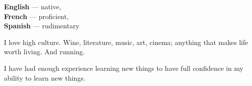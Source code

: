 \documentclass[9pt]{developercv} %
\begin{document}

\begin{minipage}[t]{0.2\textwidth}
	\vspace{-\baselineskip} %


        \textbf{English} — native,\\
        \textbf{French} — proficient,\\
        \textbf{Spanish} — rudimentary

\end{minipage}
\hfill
\begin{minipage}[t]{0.3\textwidth}
	\vspace{-\baselineskip} %


	I love high culture. Wine, literature, music, art, cinema; anything that
    makes life worth living. And running.
\end{minipage}
\hfill
\begin{minipage}[t]{0.35\textwidth}
	\vspace{-\baselineskip} %


    I have had enough experience learning new things to have full confidence in
    my ability to learn new things.
\end{minipage}

\end{document}
